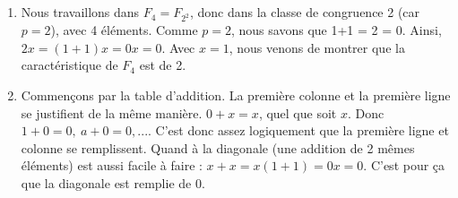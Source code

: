 \documentclass[10p,a4paper]{scrartcl}
\renewcommand{\(}{\left(}
\renewcommand{\)}{\right)}
\begin{document}
\subsection{}
\begin{enumerate}
	\item 	Nous travaillons dans $F_{4} = F_{2^2}$, donc dans la classe de congruence 2 (car $p=2$), avec 4 éléments. Comme $p=2$, nous savons que 1+1 = 2 = 0. Ainsi, $2x = (1+1)x = 0x = 0$. Avec $x=1$, nous venons de montrer que la caractéristique de $F_4$ est de 2.
	\item	Commençons par la table d'addition. La première colonne et la première ligne se justifient de la même manière. $0+x = x$, quel que soit $x$. Donc $1+0 =0,\ a+0 = 0,...$. C'est donc assez logiquement que la première ligne et colonne se remplissent. Quand à la diagonale (une addition de 2 mêmes éléments) est aussi facile à faire : $x+x = x(1+1) = 0x = 0$. C'est pour ça que la diagonale est remplie de 0.
	

\end{enumerate}
\end{document}
